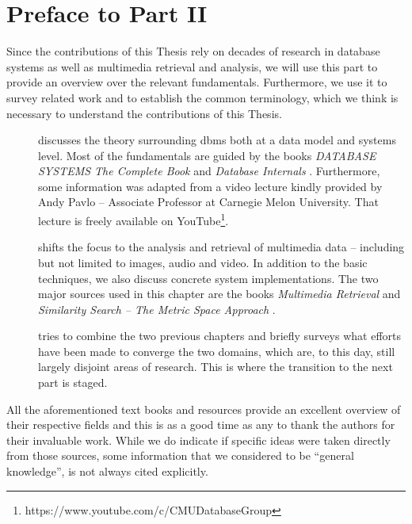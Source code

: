 \chapter*{Preface to Part II}

Since the contributions of this Thesis rely on decades of research in database systems as well as multimedia retrieval and analysis, we will use this part to provide an overview over the relevant fundamentals. Furthermore, we use it to survey related work and to establish the common terminology, which we think is necessary to understand the contributions of this Thesis.

\begin{description}
    \item[]  discusses the theory surrounding \acrlong{dbms} both at a data model and systems level. Most of the fundamentals are guided by the books \emph{DATABASE SYSTEMS The Complete Book} \cite{Garcia:2009Database} and \emph{Database Internals} \cite{Petrov:2019Database}. Furthermore, some information was adapted from a video lecture kindly provided by Andy Pavlo -- Associate Professor at Carnegie Melon University. That lecture is freely available on YouTube\footnote{https://www.youtube.com/c/CMUDatabaseGroup}.
    \item[] shifts the focus to the analysis and retrieval of multimedia data -- including but not limited to images, audio and video. In addition to the basic techniques, we also discuss concrete system implementations. The two major sources used in this chapter are the books \emph{Multimedia Retrieval} \cite{Blanken:2007multimedia} and \emph{Similarity Search -- The Metric Space Approach} \cite{Zezula:2006Similarity}.
    \item[] tries to combine the two previous chapters and briefly surveys what efforts have been made to converge the two domains, which are, to this day, still largely disjoint areas of research. This is where the transition to the next part is staged.
\end{description}

All the aforementioned text books and resources provide an excellent overview of their respective fields and this is as a good time as any to thank the authors for their invaluable work. While we do indicate if specific ideas were taken directly from those sources, some information that we considered to be ``general knowledge'', is not always cited explicitly.
